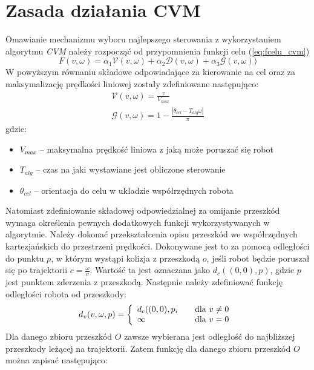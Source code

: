 	\section{Zasada działania CVM \label{sec:CVM:action}} 
	Omawianie mechanizmu wyboru najlepszego sterowania z wykorzystaniem algorytmu \textit{CVM} należy rozpocząć od przypomnienia funkcji celu (\ref{eq:fcelu_cvm})
	\begin{equation*}
	F(v,\omega)=\alpha_1 \mathcal{V}(v,\omega)+\alpha_2 \mathcal{D}(v,\omega) + \alpha_3 \mathcal{G} (v,\omega))
	\end{equation*}
	W powyższym równaniu składowe odpowiadające za kierowanie na cel oraz za maksymalizację prędkości liniowej zostały zdefiniowane następująco:
	\begin{gather}
	\mathcal{V}(v,\omega)=\frac{v}{V_{max}} \label{eq:CVM_speed}\\
	\mathcal{G}(v,\omega)=1-\frac{|\theta_{cel} -T_{alg}\omega|}{\pi} \label{eq:CVM_head}
	\end{gather}
	gdzie:
	\begin{itemize}
	 \item $V_{max}$ -- maksymalna prędkość liniowa z jaką może poruszać się robot
	 \item $T_{alg}$ -- czas na jaki wystawiane jest obliczone sterowanie
	 \item $\theta_{cel}$ -- orientacja do celu w układzie współrzędnych robota 
	\end{itemize}
	Natomiast zdefiniowanie składowej odpowiedzialnej za omijanie przeszkód wymaga określenia pewnych dodatkowych 
	funkcji wykorzystywanych w algorytmie. Należy dokonać przekształcenia opisu przeszkód we współrzędnych
	kartezjańskich  do przestrzeni prędkości. Dokonywane jest to za pomocą odległości do punktu $p$, w którym wystąpi kolizja z przeszkodą  $o$, jeśli robot będzie poruszał się po trajektorii $c=\frac{\omega}{v}$. Wartość ta jest oznaczana jako
	$d_c((0,0),p)$, gdzie $p$ jest punktem zderzenia z przeszkodą.
	Następnie należy zdefiniować funkcję odległości robota od przeszkody:
 	\begin{equation}\label{eq:CVM_dv}
	d_v(v,\omega,p)= \left\{ 
	\begin{array}{l l}
  	d_c((0,0),p_i & \quad \mbox{dla $v\neq0$}\\
  	\infty & \quad \mbox{dla $v=0$ }\\
	\end{array} \right. 
	\end{equation}
	Dla danego zbioru przeszkód $O$ zawsze wybierana jest odległość do najbliższej przeszkody leżącej na trajektorii. Zatem funkcję dla danego zbioru przeszkód $O$ można zapisać następująco:
